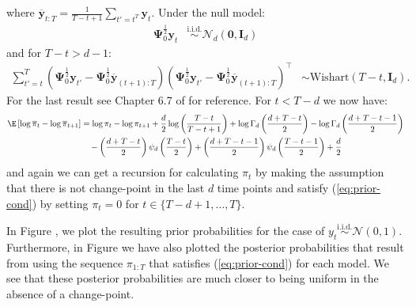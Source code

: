 \normalsize
where $\overline{\mathbf{y}}_{t:T} = \frac{1}{T-t+1}\sum_{t'=t^T}\mathbf{y}_t$. Under the null model:
\begin{align*}
    \boldsymbol{\Psi}_0^{\frac{1}{2}}\mathbf{y}_t &\overset{\text{i.i.d.}}{\sim}\mathcal{N}_d(\mathbf{0},\mathbf{I}_d)
\end{align*}
and for $T-t>d-1$:
\begin{align*}
    \sum_{t'=t}^{T} (\boldsymbol{\Psi}^{\frac{1}{2}}_{0}\mathbf{y}_{t'} - \boldsymbol{\Psi}^{\frac{1}{2}}_{0}\overline{\mathbf{y}}_{(t+1):T})(\boldsymbol{\Psi}^{\frac{1}{2}}_{0}\mathbf{y}_{t'} - \boldsymbol{\Psi}^{\frac{1}{2}}_{0}\overline{\mathbf{y}}_{(t+1):T})^\intercal &\sim \text{Wishart}(T-t,\mathbf{I}_d).
\end{align*}
For the last result see Chapter 6.7 of \cite{Chatfield80} for reference.  For $t < T-d$ we now have:
\begin{align*}
    \E\left[\log\overline{\pi}_t - \log \overline{\pi}_{t+1} \right] &= \log \pi_t- \log \pi_{t+1} + \frac{d}{2}\log\left(\frac{T-t}{T-t+1}\right) +\log \Gamma_d\left(\frac{d + T-t}{2}\right) - \log \Gamma_d\left(\frac{d + T-t-1}{2}\right) \\
    &\quad - \left(\frac{d + T - t}{2}\right)\psi_d\left(\frac{T-t}{2}\right) + \left(\frac{d + T - t-1}{2}\right)\psi_d\left(\frac{T-t-1}{2}\right) + \frac{d}{2}
\end{align*}
and again we can get a recursion for calculating $\pi_t$ by making the assumption that there is not change-point in the last $d$ time points and satisfy (\ref{eq:prior-cond}) by setting $\pi_t = 0$ for $t \in \{T-d+1,\ldots,T\}$.


In Figure , we plot the resulting prior probabilities for the case of $y_t \overset{\text{i.i.d.}}{\sim}\mathcal{N}(0,1)$. Furthermore, in Figure we have also plotted the posterior probabilities that result from using the sequence $\pi_{1:T}$ that satisfies (\ref{eq:prior-cond}) for each model. We see that these posterior probabilities are much closer to being uniform in the absence of a change-point. 

